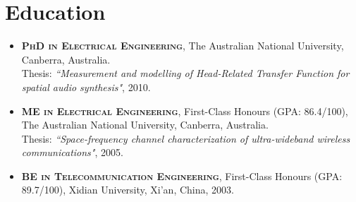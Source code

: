 \documentclass[11pt]{article}
\begin{document}
\begin{itemize}
%
%
%
%

\end{itemize}

\section*{Education}
\begin{itemize}
\item \textsc{\textbf{PhD in Electrical Engineering}}, The Australian National University,
Canberra, Australia.\\
Thesis: \emph{``Measurement and modelling of Head-Related Transfer Function for spatial audio synthesis"},
2010.
\item \textsc{\textbf{ME in Electrical Engineering}}, First-Class Honours (GPA: 86.4/100), The Australian National University, Canberra, Australia.\\
Thesis: \emph{``Space-frequency channel characterization of ultra-wideband wireless
communications"}, 2005.
\item \textsc{\textbf{BE in Telecommunication Engineering}},
First-Class Honours (GPA: 89.7/100), Xidian University, Xi'an, China, 2003.
\end{itemize}

\end{document}
